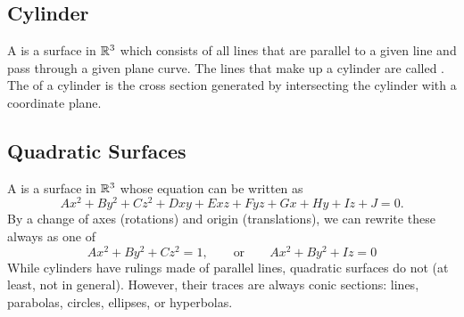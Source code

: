 \subsection{Cylinder}

A  is a surface in \(\mathbb{R}^{3}\) which consists of all lines that are parallel to a given line and pass through a given plane curve. The lines that make up a cylinder are called . The  of a cylinder is the cross section generated by intersecting the cylinder with a coordinate plane.

\subsection{Quadratic Surfaces}

A  is a surface in \(\mathbb{R}^{3}\) whose equation can be written as
\[
    Ax^{2} + By^{2} + Cz^{2} + Dxy + Exz + Fyz + Gx + Hy + Iz + J = 0.
\]
By a change of axes (rotations) and origin (translations), we can rewrite these always as one of 
\[
    Ax^{2} + By^{2} + Cz^{2} = 1, \qquad \text{or} \qquad Ax^{2} + By^{2} + Iz = 0
\]
While cylinders have rulings made of parallel lines, quadratic surfaces do not (at least, not in general).
However, their traces are always conic sections: lines, parabolas, circles, ellipses, or hyperbolas.
